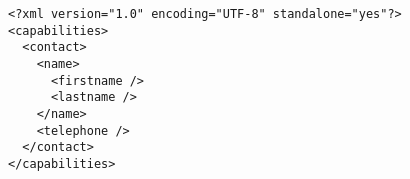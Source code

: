 \documentclass[a4paper,11pt]{article}
\begin{document}
\begin{lstlisting}
<?xml version="1.0" encoding="UTF-8" standalone="yes"?>
<capabilities>
  <contact>
    <name>
      <firstname />
      <lastname />
    </name>
    <telephone />
  </contact>
</capabilities>
\end{lstlisting}



\end{document}
